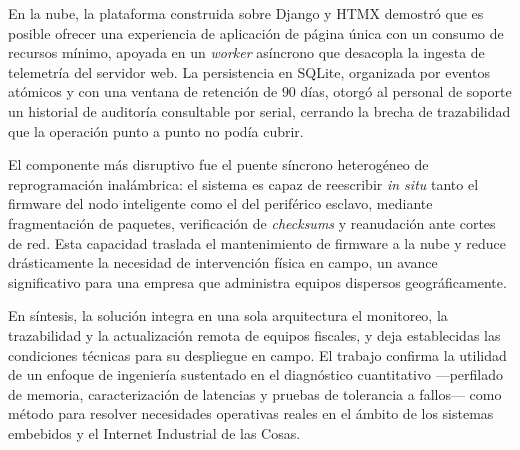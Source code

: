 \par En la nube, la plataforma construida sobre Django y HTMX demostró que es posible ofrecer una experiencia de aplicación de página única con un consumo de recursos mínimo, apoyada en un \textit{worker} asíncrono que desacopla la ingesta de telemetría del servidor web. La persistencia en SQLite, organizada por eventos atómicos y con una ventana de retención de $90$ días, otorgó al personal de soporte un historial de auditoría consultable por serial, cerrando la brecha de trazabilidad que la operación punto a punto no podía cubrir.\\

\par El componente más disruptivo fue el puente síncrono heterogéneo de reprogramación inalámbrica: el sistema es capaz de reescribir \textit{in situ} tanto el firmware del nodo inteligente como el del periférico esclavo, mediante fragmentación de paquetes, verificación de \textit{checksums} y reanudación ante cortes de red. Esta capacidad traslada el mantenimiento de firmware a la nube y reduce drásticamente la necesidad de intervención física en campo, un avance significativo para una empresa que administra equipos dispersos geográficamente.\\

\par En síntesis, la solución integra en una sola arquitectura el monitoreo, la trazabilidad y la actualización remota de equipos fiscales, y deja establecidas las condiciones técnicas para su despliegue en campo. El trabajo confirma la utilidad de un enfoque de ingeniería sustentado en el diagnóstico cuantitativo —perfilado de memoria, caracterización de latencias y pruebas de tolerancia a fallos— como método para resolver necesidades operativas reales en el ámbito de los sistemas embebidos y el Internet Industrial de las Cosas.
